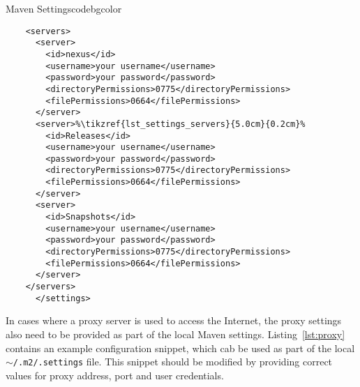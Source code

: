 \begin{code}{Maven Settings}{\label{lst:settings}}{codebgcolor}
\begin{lstlisting}
	<servers>
	  <server>
	    <id>nexus</id>
	    <username>your username</username>
	    <password>your password</password>
	    <directoryPermissions>0775</directoryPermissions>
	    <filePermissions>0664</filePermissions>
	  </server>
	  <server>%\tikzref{lst_settings_servers}{5.0cm}{0.2cm}%
	    <id>Releases</id>
	    <username>your username</username>
	    <password>your password</password>
	    <directoryPermissions>0775</directoryPermissions>
	    <filePermissions>0664</filePermissions>
	  </server>
	  <server>
	    <id>Snapshots</id>
	    <username>your username</username>
	    <password>your password</password>
	    <directoryPermissions>0775</directoryPermissions>
	    <filePermissions>0664</filePermissions>
	  </server>
	</servers>
      </settings>
    \end{lstlisting}
  \end{code}

  In cases where a proxy server is used to access the Internet, the proxy settings also need to be provided as part of the local Maven settings.
  Listing~\ref{lst:proxy} contains an example configuration snippet, which cab be used as part of the local \texttt{$\sim$/.m2/.settings} file.
  This snippet should be modified by providing correct values for proxy address, port and user credentials.

